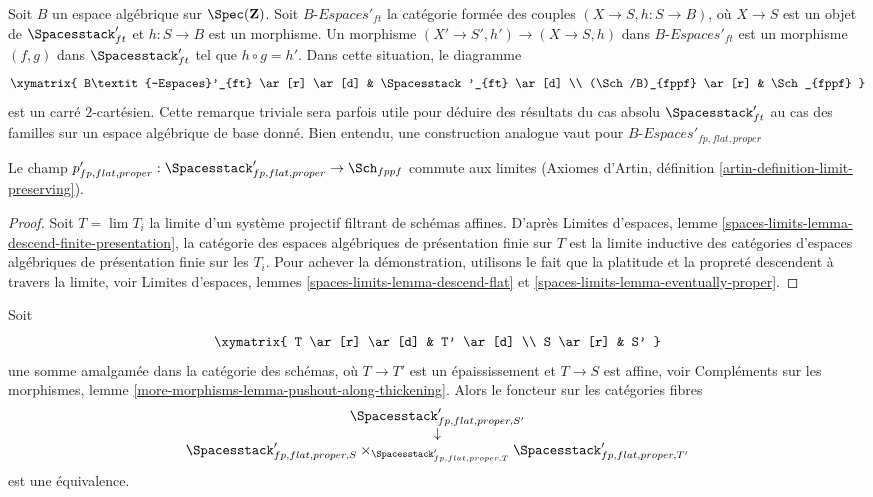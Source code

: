 \begin{remark}
\label{remark-spaces-base-change}
Soit $B$ un espace algébrique sur $\Spec(\mathbf{Z})$.
Soit $B\textit{-Espaces}'_{ft}$ la catégorie formée des couples
$(X \to S, h : S \to B)$, où $X \to S$ est un objet de
$\Spacesstack'_{ft}$ et $h : S \to B$ est un morphisme.
Un morphisme $(X' \to S', h') \to (X \to S, h)$ dans
$B\textit{-Espaces}'_{ft}$ est un morphisme $(f, g)$ dans
$\Spacesstack'_{ft}$ tel que $h \circ g = h'$.
Dans cette situation, le diagramme
$$
\xymatrix{
B\textit{-Espaces}'_{ft} \ar[r] \ar[d] & \Spacesstack'_{ft} \ar[d] \\
(\Sch/B)_{fppf} \ar[r] & \Sch_{fppf}
}
$$
est un carré $2$-cartésien. Cette remarque triviale sera parfois utile
pour déduire des résultats du cas absolu $\Spacesstack'_{ft}$ au cas des
familles sur un espace algébrique de base donné.
Bien entendu, une construction analogue vaut pour
$B\textit{-Espaces}'_{fp, flat, proper}$
\end{remark}

\begin{lemma}
\label{lemma-spaces-limits}
Le champ
$p'_{fp, flat, proper} :
\Spacesstack'_{fp, flat, proper} \to \Sch_{fppf}$ commute aux limites
(Axiomes d'Artin, définition \ref{artin-definition-limit-preserving}).
\end{lemma}

\begin{proof}
Soit $T = \lim T_i$ la limite d'un système projectif filtrant de schémas
affines. D'après Limites d'espaces, lemme
\ref{spaces-limits-lemma-descend-finite-presentation},
la catégorie des espaces algébriques de présentation finie sur $T$ est la
limite inductive des catégories d'espaces algébriques de présentation finie
sur les $T_i$.
Pour achever la démonstration, utilisons le fait que la platitude et la
propreté descendent à travers la limite, voir
Limites d'espaces, lemmes
\ref{spaces-limits-lemma-descend-flat} et
\ref{spaces-limits-lemma-eventually-proper}.
\end{proof}

\begin{lemma}
\label{lemma-spaces-RS-star}
Soit
$$
\xymatrix{
T \ar[r] \ar[d] & T' \ar[d] \\
S \ar[r] & S'
}
$$
une somme amalgamée dans la catégorie des schémas, où
$T \to T'$ est un épaississement et $T \to S$ est affine, voir
Compléments sur les morphismes, lemme
\ref{more-morphisms-lemma-pushout-along-thickening}.
Alors le foncteur sur les catégories fibres
$$
\begin{matrix}
\Spacesstack'_{fp, flat, proper, S'} \\
\downarrow \\
\Spacesstack'_{fp, flat, proper, S}
\times_{\Spacesstack'_{fp, flat, proper, T}}
\Spacesstack'_{fp, flat, proper, T'}
\end{matrix}
$$
est une équivalence.
\end{lemma}

